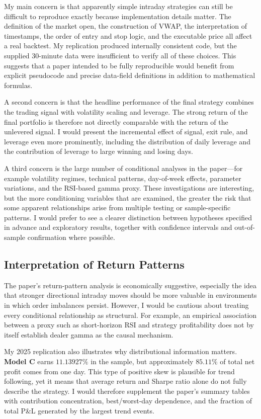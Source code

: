 \documentclass{article}
\begin{document}
My main concern is that apparently simple intraday strategies can still be difficult to reproduce exactly because implementation details matter. The definition of the market open, the construction of VWAP, the interpretation of timestamps, the order of entry and stop logic, and the executable price all affect a real backtest. My replication produced internally consistent code, but the supplied 30-minute data were insufficient to verify all of these choices. This suggests that a paper intended to be fully reproducible would benefit from explicit pseudocode and precise data-field definitions in addition to mathematical formulas.

A second concern is that the headline performance of the final strategy combines the trading signal with volatility scaling and leverage. The strong return of the final portfolio is therefore not directly comparable with the return of the unlevered signal. I would present the incremental effect of signal, exit rule, and leverage even more prominently, including the distribution of daily leverage and the contribution of leverage to large winning and losing days.

A third concern is the large number of conditional analyses in the paper---for example volatility regimes, technical patterns, day-of-week effects, parameter variations, and the RSI-based gamma proxy. These investigations are interesting, but the more conditioning variables that are examined, the greater the risk that some apparent relationships arise from multiple testing or sample-specific patterns. I would prefer to see a clearer distinction between hypotheses specified in advance and exploratory results, together with confidence intervals and out-of-sample confirmation where possible.

\subsection{Interpretation of Return Patterns}

The paper's return-pattern analysis is economically suggestive, especially the idea that stronger directional intraday moves should be more valuable in environments in which order imbalances persist. However, I would be cautious about treating every conditional relationship as structural. For example, an empirical association between a proxy such as short-horizon RSI and strategy profitability does not by itself establish dealer gamma as the causal mechanism.

My 2025 replication also illustrates why distributional information matters.\textbf{ Model C} earns \(11.13927\%\) in the sample, but approximately \(85.11\%\) of total net profit comes from one day. This type of positive skew is plausible for trend following, yet it means that average return and Sharpe ratio alone do not fully describe the strategy. I would therefore supplement the paper's summary tables with contribution concentration, best/worst-day dependence, and the fraction of total P\&L generated by the largest trend events.
\end{document}
